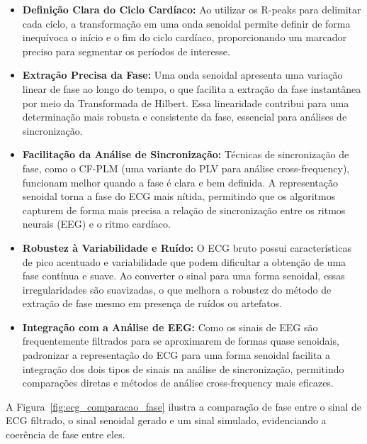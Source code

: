 \begin{itemize}
    \item \textbf{Definição Clara do Ciclo Cardíaco:} Ao utilizar os R-peaks para delimitar cada ciclo, a transformação em uma onda senoidal permite definir de forma inequívoca o início e o fim do ciclo cardíaco, proporcionando um marcador preciso para segmentar os períodos de interesse.
    \item \textbf{Extração Precisa da Fase:} Uma onda senoidal apresenta uma variação linear de fase ao longo do tempo, o que facilita a extração da fase instantânea por meio da Transformada de Hilbert. Essa linearidade contribui para uma determinação mais robusta e consistente da fase, essencial para análises de sincronização.
    \item \textbf{Facilitação da Análise de Sincronização:} Técnicas de sincronização de fase, como o CF-PLM (uma variante do PLV para análise cross-frequency), funcionam melhor quando a fase é clara e bem definida. A representação senoidal torna a fase do ECG mais nítida, permitindo que os algoritmos capturem de forma mais precisa a relação de sincronização entre os ritmos neurais (EEG) e o ritmo cardíaco.
    \item \textbf{Robustez à Variabilidade e Ruído:} O ECG bruto possui características de pico acentuado e variabilidade que podem dificultar a obtenção de uma fase contínua e suave. Ao converter o sinal para uma forma senoidal, essas irregularidades são suavizadas, o que melhora a robustez do método de extração de fase mesmo em presença de ruídos ou artefatos.
    \item \textbf{Integração com a Análise de EEG:} Como os sinais de EEG são frequentemente filtrados para se aproximarem de formas quase senoidais, padronizar a representação do ECG para uma forma senoidal facilita a integração dos dois tipos de sinais na análise de sincronização, permitindo comparações diretas e métodos de análise cross-frequency mais eficazes.
\end{itemize}

A Figura~\ref{fig:ecg_comparacao_fase} ilustra a comparação de fase entre o sinal de ECG filtrado, o sinal senoidal gerado e um sinal simulado, evidenciando a coerência de fase entre eles.

